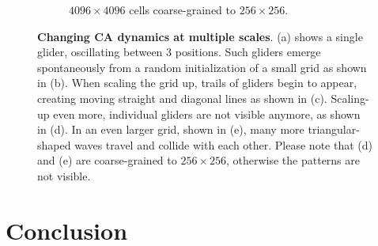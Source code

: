 \begin{figure}[ht]
\begin{subfigure}{.48\linewidth}
    \caption{\label{subfig:waves_c} $4096 \times 4096$ cells coarse-grained to $256 \times 256$.}
  \end{subfigure}
  \caption{\label{fig:dynamics_levels} \textbf{Changing CA dynamics at multiple
      scales}. (a) shows a single glider, oscillating between 3 positions. Such
    gliders emerge spontaneously from a random initialization of a small grid as
    shown in (b). When scaling the grid up, trails of gliders begin to appear,
    creating moving straight and diagonal lines as shown in (c). Scaling-up even
    more, individual gliders are not visible anymore, as shown in (d). In an
    even larger grid, shown in (e), many more triangular-shaped waves travel and
    collide with each other. Please note that (d) and (e) are coarse-grained to
    $256 \times 256$, otherwise the patterns are not visible.}
\end{figure}




\section{Conclusion\label{sec:conclusion}}

